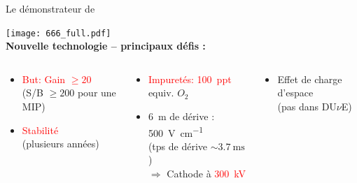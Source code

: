     \begin{frame}{Le démonstrateur de \SSS{}}
    	\begin{scriptsize}
                \centering
    			\vspace{-0.45cm}\texttt{[image: 666\_full.pdf]}\\
    			\vfill
    			\textbf{Nouvelle technologie -- principaux défis :}\\
    			\vfill
    			\begin{columns}
           			\begin{column}{0.36\textwidth}
           				\hspace{-0.5cm}\begin{itemize}
           					\item \textcolor{red}{But: Gain $\geq 20$} \\(S/B $\geq 200$ pour une MIP)
           					\item \textcolor{red}{Stabilité} \\ (plusieurs années)
           				\end{itemize}
           			\end{column}
           			\begin{column}{0.37\textwidth}
           				\begin{itemize}
           					\item \textcolor{red}{Impuretés: \SI{100}{ppt}} \\ equiv. $O_2$
           					\item \SI{6}{\meter} de dérive : \SI{500}{\volt\per\centi\meter} \\ (tps de dérive $\sim\SI{3.7}{\milli\second}$) \\ $\Rightarrow$ Cathode à \textcolor{red}{\SI{300}{\kilo\volt}}
           				\end{itemize}
            		\end{column}
            		\begin{column}{0.4\textwidth}
            			\hspace{-0.5cm}\begin{itemize}
           					\item[\textcolor{red}{\danger}] Effet de charge d'espace \\ (pas dans DU$\nu$E)
            			\end{itemize}
            		\end{column}
    			\end{columns}
    	\end{scriptsize} 
    \end{frame}
    
